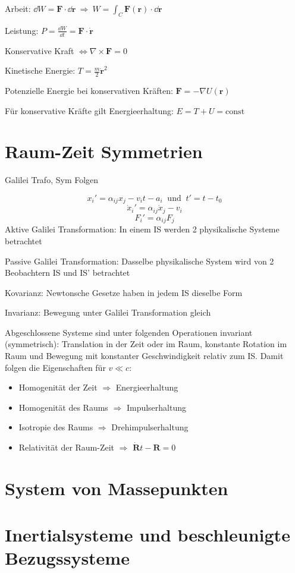 \begin{frameddefn}[Energieerhaltung]
	Arbeit: $\dd W = \mathbf{F} \cdot \dd \mathbf{r} \ \Rightarrow \ W = \int_C \mathbf{F(r)} \cdot \dd \mathbf{r}$
	
	Leistung: $ P = \frac{\dd W}{ \dd t} = \mathbf{F} \cdot \mathbf{\dot r}$
	
	Konservative Kraft $ \iff \nabla \times \mathbf{F} = 0$
	
	Kinetische Energie: $T = \frac{m}{2} \mathbf{\dot r}^2$
	
	Potenzielle Energie bei konservativen Kräften: $\mathbf{F} = - \nabla U(\mathbf{r})$
	
	Für konservative Kräfte gilt Energieerhaltung: $E = T + U = \textrm{const}$
\end{frameddefn}


\section{Raum-Zeit Symmetrien}
Galilei Trafo, Sym Folgen

\begin{framedprop}
	\[ x_i' = \alpha_{ij} x_j - v_i t - a_i \ \textrm{ und } \ t' = t - t_0 \]
	\[ \dot x_i' = \alpha_{ij} \dot x_j - v_i \]
	\[ F_i' = \alpha_{ij} F_j \]
	Aktive Galilei Transformation: In einem IS werden 2 physikalische Systeme betrachtet
	
	Passive Galilei Transformation: Dasselbe physikalische System wird von 2 Beobachtern IS und IS' betrachtet
	
	Kovarianz: Newtonsche Gesetze haben in jedem IS dieselbe Form
	
	Invarianz: Bewegung unter Galilei Transformation gleich
\end{framedprop}

\begin{framedthm}
	Abgeschlossene Systeme sind unter folgenden Operationen invariant (symmetrisch): Translation in der Zeit oder im Raum, konstante Rotation im Raum und Bewegung mit konstanter Geschwindigkeit relativ zum IS. Damit folgen die Eigenschaften für $v \ll c$:
	
	\begin{itemize}
		\item Homogenität der Zeit $\Rightarrow$ Energieerhaltung
		\item Homogenität des Raums $\Rightarrow$ Impulserhaltung
		\item Isotropie des Raums $\Rightarrow$ Drehimpulserhaltung
		\item Relativität der Raum-Zeit $\Rightarrow$ $\mathbf{\dot R} t - \mathbf{R} = 0$
	\end{itemize}
\end{framedthm}


\section{System von Massepunkten}

\section{Inertialsysteme und beschleunigte Bezugssysteme}

